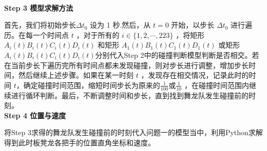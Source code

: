 \documentclass[../main.tex]{subfiles}
\begin{document}
  \\\noindent\textbf{Step 3 模型求解方法}
 \par 首先，我们将初始步长$\varDelta t_0$ 设为 1 秒.然后，从 \(t = 0\) 开始，以步长 $\varDelta t_0$ 进行遍历。在每一个时间点 \(t\) ，对于所有的 \(i \in \{1, 2, \cdots, 223\}\) ，将矩形 \(A_{i}(t)B_{i}(t)C_{i}(t)D_{i}(t)\) 和矩形 \(A_{1}(t)B_{1}(t)C_{1}(t)D_{1}(t)\) 或矩形 \(A_{i}(t)B_{i}(t)C_{i}(t)D_{i}(t)\)分别代入Step 2中的碰撞判断模型判断是否相交。若在当前步长下遍历完所有时间点都未发现碰撞，则对步长进行调整，增加步长时间，然后继续上述步骤。如果在某一时刻 \(t\) ，发现存在相交情况，记录此时的时间 \(t\)，确定碰撞时间范围，缩短时间步长为原来的\(\frac{1}{100}\)或\(\frac{1}{10}\) ，在碰撞时间范围内继续进行循环判断。最后，不断调整时间和步长，直到找到舞龙队发生碰撞前的时刻。
  \\\noindent\textbf{Step 4 位置与速度}
 \par 将Step 3求得的舞龙队发生碰撞前的时刻代入问题一的模型当中，利用Python求解得到此时板凳龙各把手的位置直角坐标和速度。
 
\end{document}
